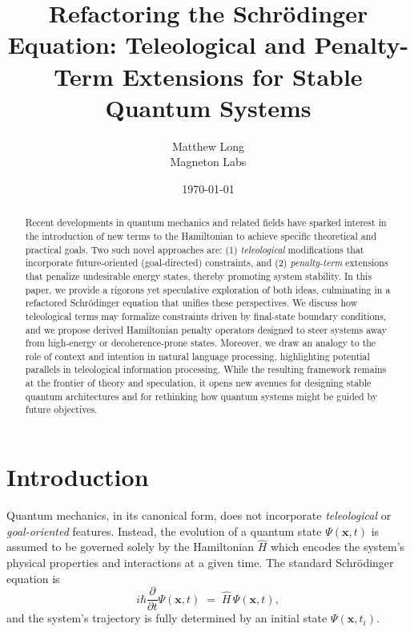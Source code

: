 \documentclass[11pt]{article}
\begin{document}
\title{\textbf{Refactoring the Schr\"odinger Equation: Teleological and Penalty-Term Extensions for Stable Quantum Systems}}
\author{Matthew Long \\
Magneton Labs}
\date{\today}
\maketitle

\begin{abstract}
Recent developments in quantum mechanics and related fields have sparked interest in the introduction of new terms to the Hamiltonian to achieve specific theoretical and practical goals. Two such novel approaches are: (1) \emph{teleological} modifications that incorporate future-oriented (goal-directed) constraints, and (2) \emph{penalty-term} extensions that penalize undesirable energy states, thereby promoting system stability. In this paper, we provide a rigorous yet speculative exploration of both ideas, culminating in a refactored Schr\"odinger equation that unifies these perspectives. We discuss how teleological terms may formalize constraints driven by final-state boundary conditions, and we propose derived Hamiltonian penalty operators designed to steer systems away from high-energy or decoherence-prone states. Moreover, we draw an analogy to the role of context and intention in natural language processing, highlighting potential parallels in teleological information processing. While the resulting framework remains at the frontier of theory and speculation, it opens new avenues for designing stable quantum architectures and for rethinking how quantum systems might be guided by future objectives.
\end{abstract}

\tableofcontents

\section{Introduction}
Quantum mechanics, in its canonical form, does not incorporate \emph{teleological} or \emph{goal-oriented} features. Instead, the evolution of a quantum state $\Psi(\mathbf{x}, t)$ is assumed to be governed solely by the Hamiltonian $\hat{H}$ which encodes the system's physical properties and interactions at a given time. The standard Schr\"odinger equation is
\begin{equation}
\label{eq:SchrodingerStandard}
i\hbar \frac{\partial}{\partial t}\Psi(\mathbf{x}, t) \;=\; \hat{H}\,\Psi(\mathbf{x}, t),
\end{equation}
and the system's trajectory is fully determined by an initial state $\Psi(\mathbf{x}, t_i)$.
\end{document}
